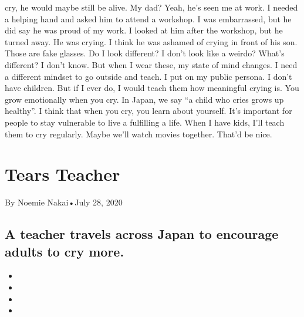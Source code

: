 \begin{itemize}
  cry, he would maybe still be alive. My dad? Yeah, he's seen me at
  work. I needed a helping hand and asked him to attend a workshop. I
  was embarrassed, but he did say he was proud of my work. I looked at
  him after the workshop, but he turned away. He was crying. I think he
  was ashamed of crying in front of his son. Those are fake glasses. Do
  I look different? I don't look like a weirdo? What's different? I
  don't know. But when I wear these, my state of mind changes. I need a
  different mindset to go outside and teach. I put on my public persona.
  I don't have children. But if I ever do, I would teach them how
  meaningful crying is. You grow emotionally when you cry. In Japan, we
  say ``a child who cries grows up healthy''. I think that when you cry,
  you learn about yourself. It's important for people to stay vulnerable
  to live a fulfilling a life. When I have kids, I'll teach them to cry
  regularly. Maybe we'll watch movies together. That'd be nice.
\end{itemize}

\hypertarget{tears-teacher-1}{%
\section{Tears Teacher}\label{tears-teacher-1}}

By Noemie Nakai•July 28, 2020

\hypertarget{a-teacher-travels-across-japan-to-encourage-adults-to-cry-more-1}{%
\subsection{A teacher travels across Japan to encourage adults to cry
more.}\label{a-teacher-travels-across-japan-to-encourage-adults-to-cry-more-1}}

\begin{itemize}
\item
\item
\item
\item
\end{itemize}

